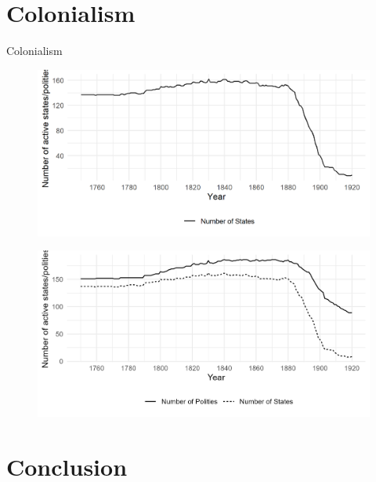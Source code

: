 \documentclass[professionalfont]{beamer}
\begin{document}
\section{Colonialism}

\begin{frame}
	\centering 
	\begin{Large}
		Colonialism
	\end{Large}
\end{frame}

\begin{frame}
	\begin{figure}
		\includegraphics[width=\linewidth]{img/N_States_Only_Over_Time.png}
	\end{figure}
\end{frame}

\begin{frame}
	\begin{figure}
		\includegraphics[width=\textwidth]{img/N_States_Over_Time.png}
	\end{figure}
\end{frame}

\section{Conclusion}
\end{document}
